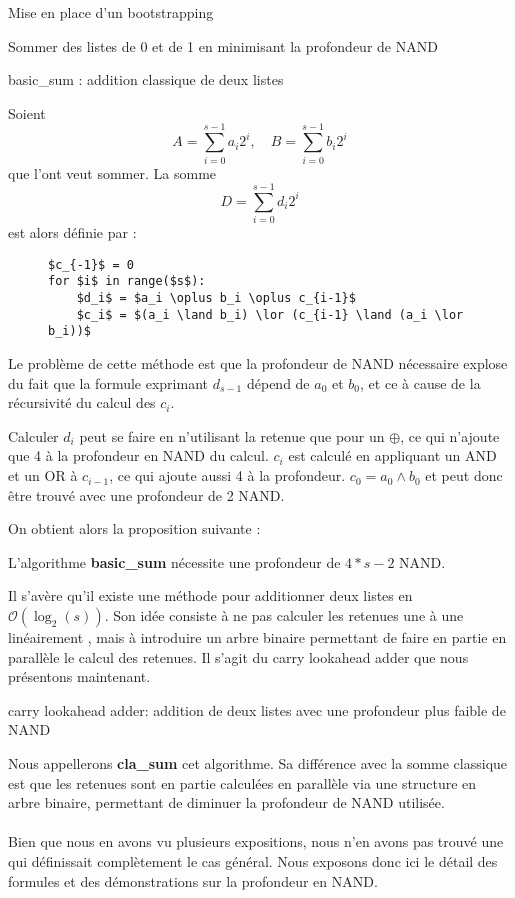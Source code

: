 \begin{section}{Mise en place d'un bootstrapping}
\begin{subsection}{Sommer des listes de 0 et de 1 en minimisant la profondeur de NAND}
\begin{subsubsection}{basic\_sum : addition classique de deux listes}
	
Soient 
\[ A = \sum_{i=0}^{s-1} a_i 2^i, \quad B = \sum_{i=0}^{s-1} b_i 2^i\]
que l'ont veut sommer. La somme
\[D =\sum_{i=0}^{s-1} d_i 2^i\]
est alors définie par :
	
\begin{figure}[!h]
\begin{lstlisting}
$c_{-1}$ = 0
for $i$ in range($s$):
	$d_i$ = $a_i \oplus b_i \oplus c_{i-1}$
	$c_i$ = $(a_i \land b_i) \lor (c_{i-1} \land (a_i \lor b_i))$
\end{lstlisting}
\end{figure}

Le problème de cette méthode est que la profondeur de NAND nécessaire explose du fait que la formule exprimant
$d_{s-1}$ dépend de $a_0$ et $b_0$, et ce à cause de la récursivité du calcul des $c_i$.

Calculer $d_i$ peut se faire en n'utilisant la retenue que pour un $\oplus$, ce qui n'ajoute que 4 à la profondeur en NAND du calcul. $c_i$ est calculé en appliquant un AND et un OR à $c_{i-1}$, ce qui ajoute aussi 4 à la profondeur. $c_0 = a_0 \land b_0$ et peut donc être trouvé avec une profondeur de 2 NAND.
	
	On obtient alors la proposition suivante :
\begin{prop}
	L'algorithme \textbf{basic\_sum} nécessite une profondeur de $4*s - 2$ NAND.
\end{prop}


Il s'avère qu'il existe une méthode pour additionner deux listes en $\mathcal{O}(\log_2(s))$. 
Son idée consiste à ne pas calculer les retenues une à une \og linéairement \fg, mais à 
introduire un arbre binaire permettant de faire en partie en parallèle le calcul des retenues.
Il s'agit du carry lookahead adder que nous présentons maintenant.

\end{subsubsection}
\begin{subsubsection}{carry lookahead adder: addition de deux listes avec une profondeur plus faible de NAND}

Nous appellerons \textbf{cla\_sum} cet algorithme. Sa différence avec la somme classique est que les retenues
sont en partie calculées en parallèle via une structure en arbre binaire, permettant de diminuer la profondeur de NAND utilisée.

\paragraph{}
Bien que nous en avons vu plusieurs expositions, nous n'en avons pas trouvé une qui définissait complètement le cas général. Nous exposons donc ici le détail des formules et des démonstrations sur la profondeur en NAND.


\end{subsubsection}
\end{subsection}
\end{section}
